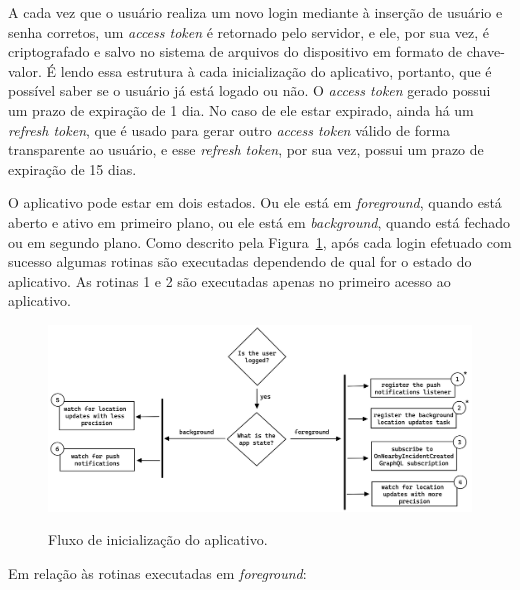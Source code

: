A cada vez que o usuário realiza um novo login mediante à inserção de usuário e senha corretos, um \emph{access token} é retornado pelo servidor, e ele, por sua vez, é criptografado e salvo no sistema de arquivos do dispositivo em formato de chave-valor. É lendo essa estrutura à cada inicialização do aplicativo, portanto, que é possível saber se o usuário já está logado ou não. O \emph{access token} gerado possui um prazo de expiração de 1 dia. No caso de ele estar expirado, ainda há um \emph{refresh token}, que é usado para gerar outro \emph{access token} válido de forma transparente ao usuário, e esse \emph{refresh token}, por sua vez, possui um prazo de expiração de 15 dias.

O aplicativo pode estar em dois estados. Ou ele está em \emph{foreground}, quando está aberto e ativo em primeiro plano, ou ele está em \emph{background}, quando está fechado ou em segundo plano. Como descrito pela Figura~\ref{f.system_app_initialization-flow}, após cada login efetuado com sucesso algumas rotinas são executadas dependendo de qual for o estado do aplicativo. As rotinas 1 e 2 são executadas apenas no primeiro acesso ao aplicativo.

\begin{figure}[htbp]
	\caption{\small Fluxo de inicialização do aplicativo.}
	\centering
	\includegraphics[width=\textwidth]{../diagrams/out/system_app_initialization-flow.png}
	\label{f.system_app_initialization-flow}
\end{figure}

\FloatBarrier

Em relação às rotinas executadas em \emph{foreground}:

